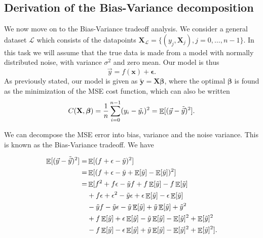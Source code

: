 \documentclass[norsk,a4paper,12pt]{scrartcl}
\newcommand{\Lagr}{\mathcal{L}}
\DeclareMathOperator*{\E}{\mathbb{E}}
\renewcommand{\vec}[1]{\mathbf{#1}} %
\begin{document}
\subsection{Derivation of the Bias-Variance decomposition }\label{sec:bias_var_derivation}
We now move on to the Bias-Variance tradeoff analysis. We consider a general dataset $\Lagr$ which consists of the datapoints $\boldsymbol{X}_{\Lagr} = \{(y_j, \boldsymbol{X}_j), j=0, \hdots, n-1\}$. In this task we will assume that the true data is made from a model with normally distributed noise, with variance $\sigma^2$ and zero mean. Our model is thus 
\begin{equation}
    \Vec{y} = f(\boldsymbol{x}) + \boldsymbol\epsilon. 
\end{equation}
As previously stated, our model is given as $\tilde{\vec{y}} = \boldsymbol{X}\boldsymbol{\beta}$, where the optimal $\boldsymbol{\beta}$ is found as the minimization of the MSE cost function, which can also be written
\begin{equation}
    C(\vec{X},\boldsymbol{\beta}) = \frac{1}{n}\sum_{i=0}^{n-1} (y_i - \Tilde{y_i})^2 = \E [ (\Vec{y} - \Tilde{\Vec{y}})^2].
\end{equation}

We can decompose the MSE error into bias, variance and the noise variance. This is known as the Bias-Variance tradeoff. We have

\begin{equation*}
    \begin{aligned}
        \E [ (\Vec{y} - \Tilde{\Vec{y}})^2] = &\E [ ( f+\epsilon -\Tilde{y} )^2] \\
        = &\E [ ( f+\epsilon -\Tilde{y} + \E [\Tilde{y}] - \E [\Tilde{y}] )^2] \\
        = &\E [ f^2 + f\epsilon - \Tilde{y}f + f\E [\Tilde{y}] - f\E [\Tilde{y}] \\
        &+ f\epsilon + \epsilon^2 -\Tilde{y}\epsilon + \epsilon\E [\Tilde{y}] - \epsilon\E [\Tilde{y}] \\
        &- \Tilde{y}f - \Tilde{y}\epsilon - \Tilde{y}\E [\Tilde{y}] + \Tilde{y}\E [\Tilde{y}] +\Tilde{y}^2 \\
        &+ f\E[\Tilde{y}] + \epsilon\E[\Tilde{y}] - \Tilde{y}\E[\Tilde{y}] - \E[\Tilde{y}]^2 + \E[\Tilde{y}]^2 \\
        &- f\E[\Tilde{y}] - \epsilon\E[\Tilde{y}] + \Tilde{y}\E[\Tilde{y}] - \E[\Tilde{y}]^2 + \E[\Tilde{y}]^2].
    \end{aligned}
\end{equation*}
\end{document}

